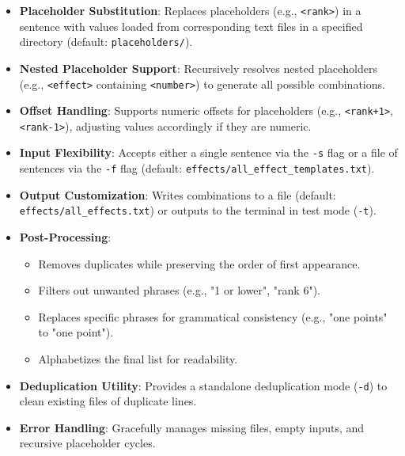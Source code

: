 \begin{itemize}
    \item \textbf{Placeholder Substitution}: Replaces placeholders (e.g., \texttt{<rank>}) in a sentence with values loaded from corresponding text files in a specified directory (default: \texttt{placeholders/}).
    \item \textbf{Nested Placeholder Support}: Recursively resolves nested placeholders (e.g., \texttt{<effect>} containing \texttt{<number>}) to generate all possible combinations.
    \item \textbf{Offset Handling}: Supports numeric offsets for placeholders (e.g., \texttt{<rank+1>}, \texttt{<rank-1>}), adjusting values accordingly if they are numeric.
    \item \textbf{Input Flexibility}: Accepts either a single sentence via the \texttt{-s} flag or a file of sentences via the \texttt{-f} flag (default: \texttt{effects/all\_effect\_templates.txt}).
    \item \textbf{Output Customization}: Writes combinations to a file (default: \texttt{effects/all\_effects.txt}) or outputs to the terminal in test mode (\texttt{-t}).
    \item \textbf{Post-Processing}: 
        \begin{itemize}
            \item Removes duplicates while preserving the order of first appearance.
            \item Filters out unwanted phrases (e.g., "1 or lower", "rank 6").
            \item Replaces specific phrases for grammatical consistency (e.g., "one points" to "one point").
            \item Alphabetizes the final list for readability.
        \end{itemize}
    \item \textbf{Deduplication Utility}: Provides a standalone deduplication mode (\texttt{-d}) to clean existing files of duplicate lines.
    \item \textbf{Error Handling}: Gracefully manages missing files, empty inputs, and recursive placeholder cycles.
\end{itemize}

